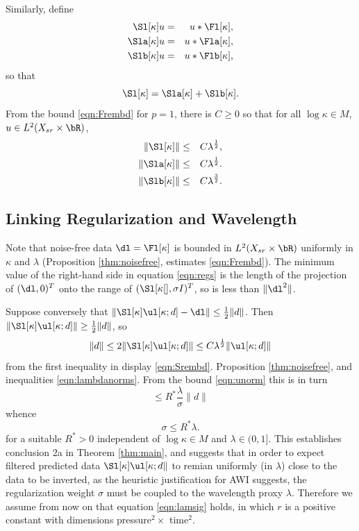 Similarly, define
\begin{eqnarray}
  \label{eqn:sdeflam}
  \Sl[\kappa]u &=& u *\Fl[\kappa],  \nonumber \\
  \Sla[\kappa]u &=& u *\Fla[\kappa], \nonumber\\
  \Slb[\kappa]u &=& u *\Flb[\kappa], 
\end{eqnarray}
so that
\[
  \Sl[\kappa] = \Sla[\kappa] + \Slb[\kappa].
\]
From the bound \ref{eqn:Frembd} for $p=1$, there is $C \ge 0$ so that
for all $\log \kappa \in M$, $u \in L^2(X_{sr} \times \bR)$,
\begin{eqnarray}
  \label{eqn:Srembd}
  \|\Sl[\kappa]\| &\le&  C\lambda^{\frac{1}{2}},\nonumber \\
  \|\Sla[\kappa]\|& \le& C\lambda^{\frac{1}{2}}. \nonumber \\
  \|\Slb[\kappa]\| & \le& C\lambda^{\frac{3}{2}}.
\end{eqnarray}

\subsection{Linking Regularization and Wavelength}
Note that noise-free data $\dl = \Fl[\kappa]$ is bounded in $L^2(X_{sr}
\times \bR)$ uniformly in $\kappa$ and $\lambda$  (Proposition
\ref{thm:noisefree}, estimates \ref{eqn:Frembd}). 
The minimum value of the right-hand side in equation \ref{eqn:regs} is
the length of the projection of $(\dl,0)^T$ onto the range of
$(\Sl[\kappa[],\sigma I)^T$, so is less than $\|\dl^2\|$.

Suppose conversely that $\|\Sl[\kappa]\ul[\kappa;d] - \dl\| \le
\frac{1}{2}\|d\|$. Then $\|\Sl[\kappa]\ul[\kappa;d] \| \ge
\frac{1}{2}\|d\|$, so
\[
  \|d\| \le 2\|\Sl[\kappa]\ul[\kappa;d] \| \le
  C\lambda^{\frac{1}{2}}\|\ul[\kappa;d]\|
\]
from the first inequality in display \ref{eqn:Srembd}. Proposition \ref{thm:noisefree}, and
inequalities \ref{eqn:lambdanorms}. From the bound \ref{eqn:unorm} this is in
turn
\[
  \le R^* \frac{\lambda}{\sigma} \|d\|
\]
whence
\[
  \sigma \le R^* \lambda.
\]
for a suitable $R^*>0$ independent of $\log \kappa \in M$ and $\lambda
\in (0,1]$. This establishes conclusion 2a in Theorem \ref{thm:main}, and
suggests that in order to expect filtered predicted data
$\Sl[\kappa]\ul[\kappa;d\|$ to remian uniformly (in $\lambda$) close to the data to be
inverted, as the heuristic justification for AWI suggests, the
regularization weight $\sigma$ must be coupled to the wavelength proxy
$\lambda$. Therefore we assume from now on that equation
\ref{eqn:lamsig} holds,  
in which $r$ is a positive constant with dimensions pressure$^2 \times 
$ time$^2$.

